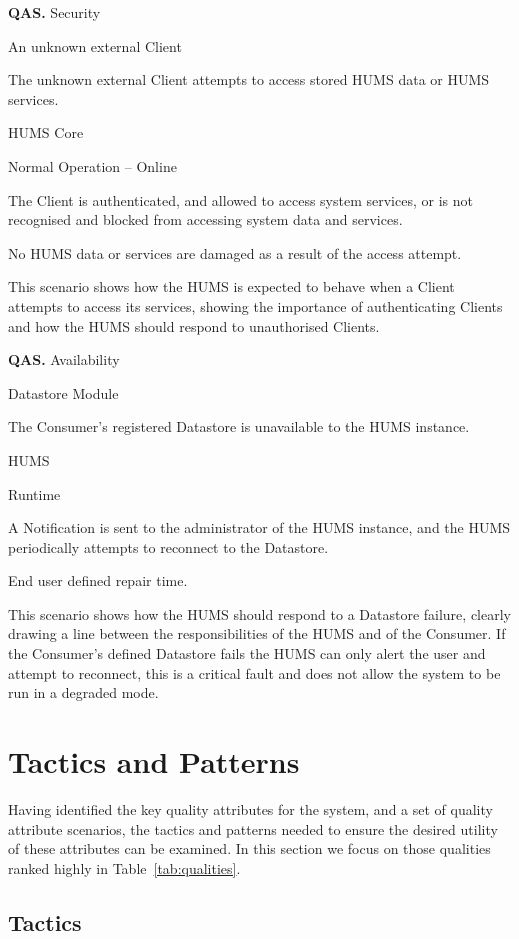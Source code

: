 \documentclass[10pt,a4paper]{article}
\newcommand{\qas}[1]{\textcolor{reqColor}{\textbf{QAS.#1}}}
\newenvironment{scenario}[1]{
\newcommand{\source}[1]{\item[Source of Stimulus:] ##1}
\newcommand{\stimulus}[1]{\item[Stimulus:] ##1}
\newcommand{\artifact}[1]{\item[Artifact:] ##1}
\newcommand{\environment}[1]{\item[Environment:] ##1}
\newcommand{\response}[1]{\item[Response:] ##1}
\newcommand{\measure}[1]{\item[Response Measure:] ##1}
\newcommand{\rationale}[1]{\item[Scenario Rationale:] ##1}
\newcommand{\quality}[1]{\item[Quality:] ##1}
		\begin{description} [noitemsep]	
		\item[Scenario ID:] \qas{#1}
		}{\end{description} \vspace*{0.3cm}
		}
\begin{document}
\begin{scenario}{3}
\quality{Security}
\source{An unknown external Client}
\stimulus{The unknown external Client attempts to access stored HUMS data or HUMS services.}
\artifact{HUMS Core}
\environment{Normal Operation -- Online}
\response{The Client is authenticated, and allowed to access system services, or is not recognised and blocked from accessing system data and services.}
\measure{No HUMS data or services are damaged as a result of the access attempt.}
\rationale{This scenario shows how the HUMS is expected to behave when a Client attempts to access its services, showing the importance of authenticating Clients and how the HUMS should respond to unauthorised Clients.}
\end{scenario}

\begin{scenario}{4}
\quality{Availability}
\source{Datastore Module}
\stimulus{The Consumer's registered Datastore is unavailable to the HUMS instance.}
\artifact{HUMS}
\environment{Runtime}
\response{A Notification is sent to the administrator of the HUMS instance, and the HUMS periodically attempts to reconnect to the Datastore.}
\measure{End user defined repair time.}
\rationale{This scenario shows how the HUMS should respond to a Datastore failure, clearly drawing a line between the responsibilities of the HUMS and of the Consumer. If the Consumer's defined Datastore fails the HUMS can only alert the user and attempt to reconnect, this is a critical fault and does not allow the system to be run in a degraded mode.}
\end{scenario}

\section{Tactics and Patterns}
\label{sec:tactics}
Having identified the key quality attributes for the system, and a set of quality attribute scenarios, the tactics and patterns needed to ensure the desired utility of these attributes can be examined. In this section we focus on those qualities ranked highly in Table~\ref{tab:qualities}.

\subsection{Tactics}
\end{document}
